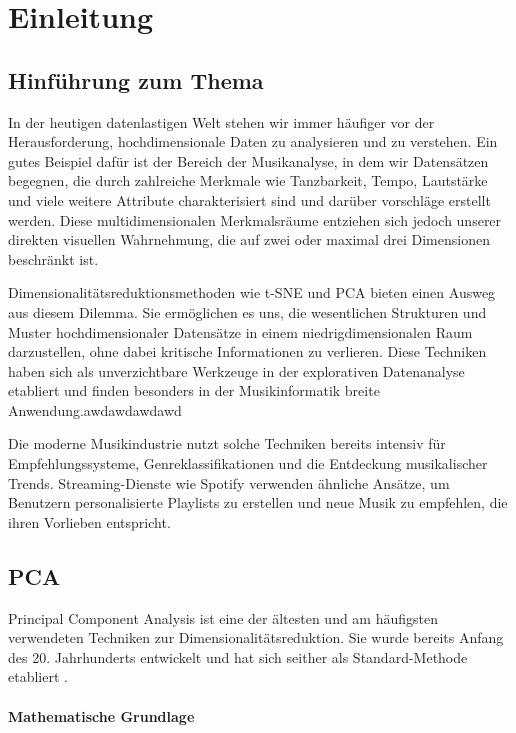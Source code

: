 
\chapter{Einleitung}

\section{Hinführung zum Thema}
In der heutigen datenlastigen Welt stehen wir immer häufiger vor der Herausforderung, hochdimensionale Daten zu analysieren und zu verstehen. Ein gutes Beispiel dafür ist der Bereich der Musikanalyse, in dem wir Datensätzen begegnen, die durch zahlreiche Merkmale wie Tanzbarkeit, Tempo, Lautstärke und viele weitere Attribute charakterisiert sind und darüber vorschläge erstellt werden. Diese multidimensionalen Merkmalsräume entziehen sich jedoch unserer direkten visuellen Wahrnehmung, die auf zwei oder maximal drei Dimensionen beschränkt ist.

Dimensionalitätsreduktionsmethoden wie \acf{t-SNE} \cite{vanDerMaaten2008} und \acf{PCA} \cite{Jolliffe2002} bieten einen Ausweg aus diesem Dilemma. Sie ermöglichen es uns, die wesentlichen Strukturen und Muster hochdimensionaler Datensätze in einem niedrigdimensionalen Raum darzustellen, ohne dabei kritische Informationen zu verlieren. Diese Techniken haben sich als unverzichtbare Werkzeuge in der explorativen Datenanalyse etabliert und finden besonders in der Musikinformatik breite Anwendung.awdawdawdawd

Die moderne Musikindustrie nutzt solche Techniken bereits intensiv für Empfehlungssysteme, Genreklassifikationen und die Entdeckung musikalischer Trends. Streaming-Dienste wie Spotify verwenden ähnliche Ansätze, um Benutzern personalisierte Playlists zu erstellen und neue Musik zu empfehlen, die ihren Vorlieben entspricht.

\section{\acf{PCA}}

Principal Component Analysis ist eine der ältesten und am häufigsten verwendeten Techniken zur Dimensionalitätsreduktion. Sie wurde bereits Anfang des 20. Jahrhunderts entwickelt und hat sich seither als Standard-Methode etabliert \cite{Pearson1901}.

\subsubsection{Mathematische Grundlage}

